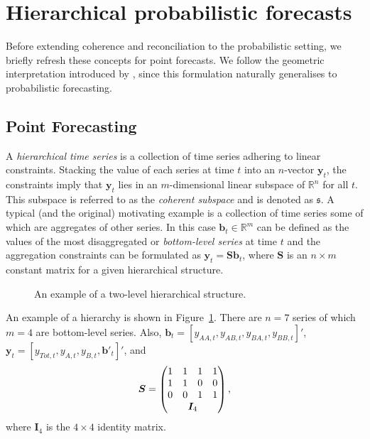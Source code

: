 \documentclass[a4paper,12pt]{article}
\theoremstyle{definition}
\begin{document}
\section{Hierarchical probabilistic forecasts}\label{sec:ProbForecasts}

Before extending coherence and reconciliation to the probabilistic setting, we briefly refresh these concepts for point forecasts. We follow the geometric interpretation introduced by \cite{PanEtAl2020_Geometry}, since this formulation naturally generalises to probabilistic forecasting.

\subsection{Point Forecasting}\label{sec:PointForecasts}

A \emph{hierarchical time series} is a collection of time series adhering to linear constraints. Stacking the value of each series at time $t$ into an $n$-vector $\bm{y}_t$, the constraints imply that $\bm{y}_t$ lies in an $m$-dimensional linear subspace of $\mathbb{R}^n$ for all $t$. This subspace is referred to as the \emph{coherent subspace} and is denoted as $\mathfrak{s}$. A typical (and the original) motivating example is a collection of time series some of which are aggregates of other series. In this case $\bm{b}_t \in \mathbb{R}^m$ can be defined as the values of the most disaggregated or \emph{bottom-level series} at time $t$ and the aggregation constraints can be formulated as $\bm{y}_t = \bm{S}\bm{b}_t$, where $\bm{S}$ is an $n \times m$ constant matrix for a given hierarchical structure.

\begin{figure}[!htb]
	\begin{center}
		 
		 
		\qobitree
	\end{center}
	\caption{An example of a two-level hierarchical structure.}\label{fig:twoL-hier}
\end{figure}
An example of a hierarchy is shown in Figure~\ref{fig:twoL-hier}. There are $n=7$ series of which $m=4$ are bottom-level series. Also, $\bm{b}_t = [y_{AA,t}, y_{AB,t}, y_{BA,t}, y_{BB,t}]'$, $\bm{y}_t = [y_{Tot,t},y_{A,t}, y_{B,t},\bm{b}'_t]'$, and
\[
\bm{S} = \begin{pmatrix}
1 & 1 & 1 & 1 \\
1 & 1 & 0 & 0 \\
0 & 0 & 1 & 1 \\
& \multicolumn{2}{c}{\bm{I}_4} &
\end{pmatrix},
\]
where $\bm{I}_4$ is the $4\times 4$ identity matrix.
\end{document}

